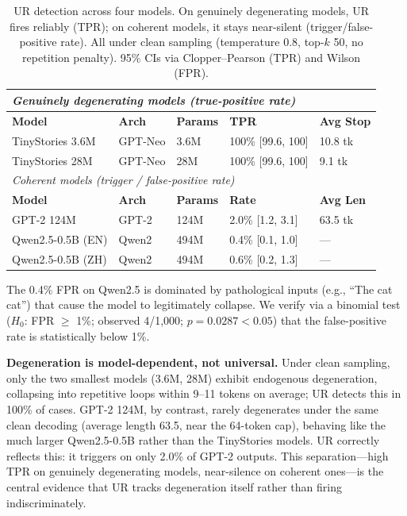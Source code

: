 \documentclass[11pt]{article}
\begin{document}
\begin{table}[t]
\centering
\caption{UR detection across four models. On genuinely degenerating models, UR fires reliably (TPR); on coherent models, it stays near-silent (trigger/false-positive rate). All under clean sampling (temperature 0.8, top-$k$ 50, no repetition penalty). 95\% CIs via Clopper--Pearson (TPR) and Wilson (FPR).}
\label{tab:main-result}
\begin{tabular}{lllll}
\toprule
\multicolumn{5}{l}{\textit{Genuinely degenerating models (true-positive rate)}} \\
\midrule
\textbf{Model} & \textbf{Arch} & \textbf{Params} & \textbf{TPR} & \textbf{Avg Stop} \\
\midrule
TinyStories 3.6M & GPT-Neo & 3.6M & 100\% [99.6, 100] & 10.8 tk \\
TinyStories 28M & GPT-Neo & 28M & 100\% [99.6, 100] & 9.1 tk \\
\midrule
\multicolumn{5}{l}{\textit{Coherent models (trigger / false-positive rate)}} \\
\midrule
\textbf{Model} & \textbf{Arch} & \textbf{Params} & \textbf{Rate} & \textbf{Avg Len} \\
\midrule
GPT-2 124M & GPT-2 & 124M & 2.0\% [1.2, 3.1] & 63.5 tk \\
Qwen2.5-0.5B (EN) & Qwen2 & 494M & 0.4\% [0.1, 1.0] & --- \\
Qwen2.5-0.5B (ZH) & Qwen2 & 494M & 0.6\% [0.2, 1.3] & --- \\
\bottomrule
\end{tabular}
\end{table}

The 0.4\% FPR on Qwen2.5 is dominated by pathological inputs (e.g., ``The cat cat'') that cause the model to legitimately collapse. We verify via a binomial test ($H_0$: FPR $\ge$ 1\%; observed 4/1,000; $p = 0.0287 < 0.05$) that the false-positive rate is statistically below 1\%.

\textbf{Degeneration is model-dependent, not universal.} Under clean sampling, only the two smallest models (3.6M, 28M) exhibit endogenous degeneration, collapsing into repetitive loops within 9--11 tokens on average; UR detects this in 100\% of cases. GPT-2 124M, by contrast, rarely degenerates under the same clean decoding (average length 63.5, near the 64-token cap), behaving like the much larger Qwen2.5-0.5B rather than the TinyStories models. UR correctly reflects this: it triggers on only 2.0\% of GPT-2 outputs. This separation---high TPR on genuinely degenerating models, near-silence on coherent ones---is the central evidence that UR tracks degeneration itself rather than firing indiscriminately.
\end{document}
